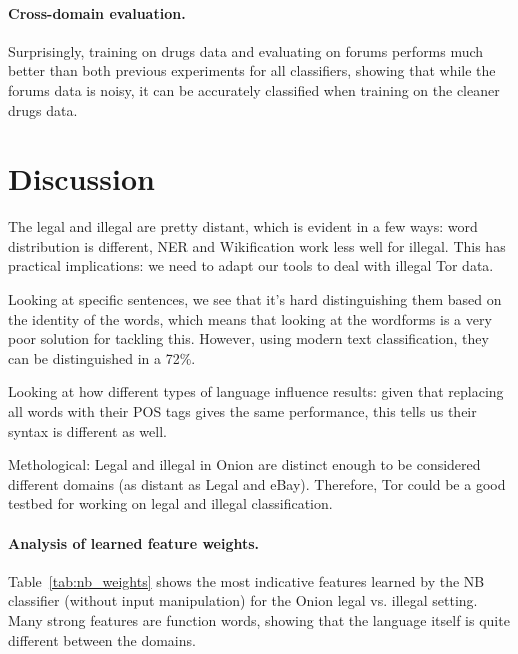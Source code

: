 \documentclass[11pt,a4paper,table]{article}
\begin{document}
\paragraph{Cross-domain evaluation.}

Surprisingly, training on drugs data and evaluating on forums performs much
better than both previous experiments for all classifiers,
showing that while the forums data is noisy, it can be accurately classified
when training on the cleaner drugs data.


\section{Discussion}

The legal and illegal are pretty distant, which is evident in a few ways: word distribution is different, NER and Wikification work less well
for illegal. This has practical implications: we need to adapt our tools to deal with illegal Tor data. 

Looking at specific sentences, we see that it's hard distinguishing them based on the identity of the words, which means that
looking at the wordforms is a very poor solution for tackling this. However, using modern text classification, they can be distinguished
in a 72\%. 

Looking at how different types of language influence results: given that replacing all words with their POS tags gives
the same performance, this tells us their syntax is different as well.

Methological: Legal and illegal in Onion are distinct enough to be considered different domains (as distant as Legal and eBay). 
Therefore, Tor could be a good testbed for working on legal and illegal classification.

\paragraph{Analysis of learned feature weights.}

Table~\ref{tab:nb_weights} shows the most indicative features learned
by the NB classifier (without input manipulation) for the Onion
legal vs. illegal setting.
Many strong features are function words, showing that the language itself
is quite different between the domains.
\end{document}
